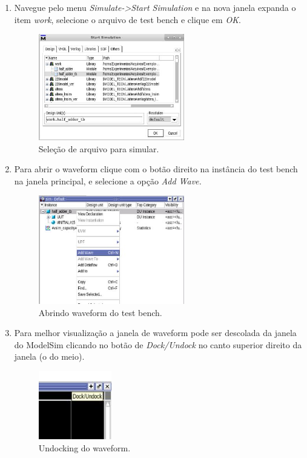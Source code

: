\documentclass[12pt]{article}
\begin{document}
\begin{enumerate}[font=\bfseries]
    \item Navegue pelo menu \textit{Simulate->Start Simulation} e na nova janela expanda o item \textit{work}, selecione o arquivo de test bench e clique em \textit{OK}.
    \begin{figure}[H]
    \centering
    \includegraphics[width=0.6\textwidth]{img/modelsim-simulate.jpg}
    \caption{\label{ref:modelsim-simulate}Seleção de arquivo para simular.}
    \end{figure}

    \item Para abrir o waveform clique com o botão direito na instância do test bench na janela principal, e selecione a opção \textit{Add Wave.}
    \begin{figure}[H]
    \centering
    \includegraphics[width=0.6\textwidth]{img/modelsim-waveform.jpg}
    \caption{\label{ref:modelsim-waveform}Abrindo waveform do test bench.}
    \end{figure}

    \item Para melhor visualização a janela de waveform pode ser descolada da janela do ModelSim clicando no botão de \textit{Dock/Undock} no canto superior direito da janela (o do meio).
    \begin{figure}[H]
    \centering
    \includegraphics[width=0.3\textwidth]{img/modelsim-undocking.jpg}
    \caption{\label{ref:modelsim-undock}Undocking do waveform.}
    \end{figure}


\end{enumerate}
\end{document}
